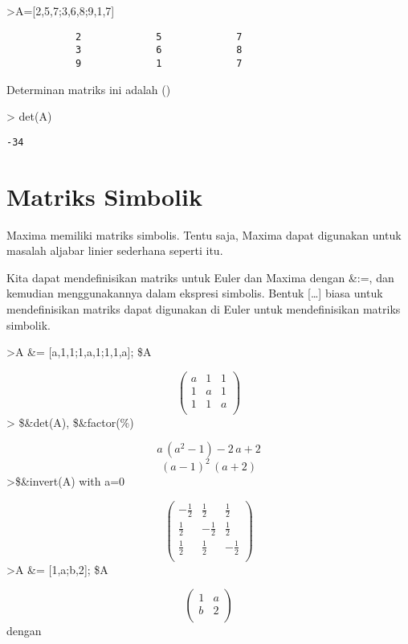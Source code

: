 \documentclass[
]{book}
\begin{document}
\textgreater A={[}2,5,7;3,6,8;9,1,7{]}

\begin{verbatim}
            2             5             7 
            3             6             8 
            9             1             7 
\end{verbatim}

Determinan matriks ini adalah ()

\textgreater{} det(A)

\begin{verbatim}
-34
\end{verbatim}

\section{Matriks Simbolik}\label{matriks-simbolik}

Maxima memiliki matriks simbolis. Tentu saja, Maxima dapat digunakan untuk masalah aljabar linier sederhana seperti itu.

Kita dapat mendefinisikan matriks untuk Euler dan Maxima dengan \&:=, dan kemudian menggunakannya dalam ekspresi simbolis. Bentuk {[}\ldots{]} biasa untuk mendefinisikan matriks dapat digunakan di Euler untuk mendefinisikan matriks simbolik.

\textgreater A \&= {[}a,1,1;1,a,1;1,1,a{]}; \$A

\[\begin{pmatrix}a & 1 & 1 \\ 1 & a & 1 \\ 1 & 1 & a \\ \end{pmatrix}\]\textgreater{} \$\&det(A), \$\&factor(\%)

\[a\,\left(a^2-1\right)-2\,a+2\]\[\left(a-1\right)^2\,\left(a+2\right)\]\textgreater\$\&invert(A) with a=0

\[\begin{pmatrix}-\frac{1}{2} & \frac{1}{2} & \frac{1}{2} \\ \frac{1
 }{2} & -\frac{1}{2} & \frac{1}{2} \\ \frac{1}{2} & \frac{1}{2} & -
 \frac{1}{2} \\ \end{pmatrix}\]\textgreater A \&= {[}1,a;b,2{]}; \$A

\[\begin{pmatrix}1 & a \\ b & 2 \\ \end{pmatrix}\]dengan
\end{document}
